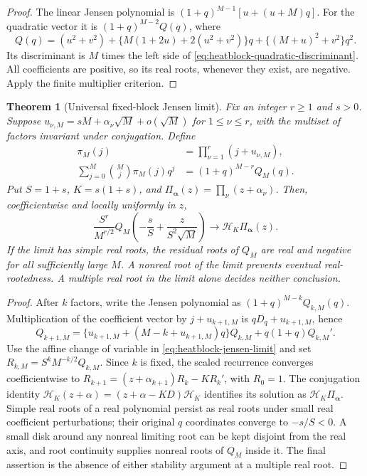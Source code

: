 \documentclass[11pt]{article}
\newtheorem{theorem}{Theorem}[section]
\theoremstyle{definition}
\theoremstyle{remark}
\begin{document}
\begin{proof}
The linear Jensen polynomial is
$(1+q)^{M-1}[u+(u+M)q]$.  For the quadratic vector it is
$(1+q)^{M-2}Q(q)$, where
\[
 Q(q)=(u^2+v^2)
 +\{M(1+2u)+2(u^2+v^2)\}q
 +\{(M+u)^2+v^2\}q^2.
\]
Its discriminant is $M$ times the left side of
\eqref{eq:heatblock-quadratic-discriminant}.  All coefficients are
positive, so its real roots, whenever they exist, are negative.
Apply the finite multiplier criterion.
\end{proof}

\begin{theorem}[Universal fixed-block Jensen limit]
\label{thm:heatblock-jensen-limit}
Fix an integer $r\ge1$ and $s>0$.  Suppose
$u_{\nu,M}=sM+\alpha_\nu\sqrt M+o(\sqrt M)$ for $1\le\nu\le r$,
with the multiset of factors invariant under conjugation.  Define
\begin{equation}
 \begin{split}
 \pi_M(j)&=\prod_{\nu=1}^r(j+u_{\nu,M}),\\
 \sum_{j=0}^M\binom Mj\pi_M(j)q^j
 &=(1+q)^{M-r}Q_M(q).
 \end{split}
 \label{eq:heatblock-finite-factor}
\end{equation}
Put $S=1+s$, $K=s(1+s)$, and
$\Pi_{\boldsymbol\alpha}(z)=\prod_\nu(z+\alpha_\nu)$.  Then,
coefficientwise and locally uniformly in $z$,
\begin{equation}
 \frac{S^r}{M^{r/2}}
 Q_M\!\left(-\frac{s}{S}+\frac{z}{S^2\sqrt M}\right)
 \longrightarrow \mathcal H_K\Pi_{\boldsymbol\alpha}(z).
 \label{eq:heatblock-jensen-limit}
\end{equation}
If the limit has simple real roots, the residual roots of $Q_M$ are
real and negative for all sufficiently large $M$.  A nonreal root of
the limit prevents eventual real-rootedness.  A multiple real root in
the limit alone decides neither conclusion.
\end{theorem}

\begin{proof}
After $k$ factors, write the Jensen polynomial as
$(1+q)^{M-k}Q_{k,M}(q)$.  Multiplication of the coefficient vector by
$j+u_{k+1,M}$ is $qD_q+u_{k+1,M}$, hence
\begin{equation}
 Q_{k+1,M}=
 \{u_{k+1,M}+(M-k+u_{k+1,M})q\}Q_{k,M}
 +q(1+q)Q_{k,M}'.
 \label{eq:heatblock-exact-recurrence}
\end{equation}
Use the affine change of variable in \eqref{eq:heatblock-jensen-limit}
and set $R_{k,M}=S^kM^{-k/2}Q_{k,M}$.  Since $k$ is fixed, the scaled
recurrence converges coefficientwise to
$R_{k+1}=(z+\alpha_{k+1})R_k-KR_k'$, with $R_0=1$.
The conjugation identity
$\mathcal H_K(z+\alpha)=(z+\alpha-KD)\mathcal H_K$
identifies its solution as $\mathcal H_K\Pi_{\boldsymbol\alpha}$.
Simple real roots of a real polynomial persist as real roots under
small real coefficient perturbations; their original $q$ coordinates
converge to $-s/S<0$.  A small disk around any nonreal limiting root
can be kept disjoint from the real axis, and root continuity supplies
nonreal roots of $Q_M$ inside it.  The final assertion is the absence
of either stability argument at a multiple real root.
\end{proof}
\end{document}
